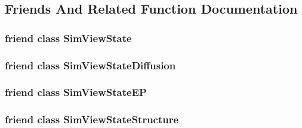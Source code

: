\subsection{Friends And Related Function Documentation}
\hypertarget{classgl_atrium_a9879084bed338fc174a8d2fe04996ce3}{
\subsubsection[{Sim\+View\+State}]{\setlength{\rightskip}{0pt plus 5cm}friend class {\bf Sim\+View\+State}\hspace{0.3cm}{\ttfamily [friend]}}}\label{classgl_atrium_a9879084bed338fc174a8d2fe04996ce3}
\hypertarget{classgl_atrium_a1f495b2c4e91f752b635ad082004df63}{
\subsubsection[{Sim\+View\+State\+Diffusion}]{\setlength{\rightskip}{0pt plus 5cm}friend class {\bf Sim\+View\+State\+Diffusion}\hspace{0.3cm}{\ttfamily [friend]}}}\label{classgl_atrium_a1f495b2c4e91f752b635ad082004df63}
\hypertarget{classgl_atrium_a76eb2c10fcf71ef86e90466fa0becdcb}{
\subsubsection[{Sim\+View\+State\+E\+P}]{\setlength{\rightskip}{0pt plus 5cm}friend class {\bf Sim\+View\+State\+E\+P}\hspace{0.3cm}{\ttfamily [friend]}}}\label{classgl_atrium_a76eb2c10fcf71ef86e90466fa0becdcb}
\hypertarget{classgl_atrium_a05f31e8af7a8b263cc06dbc57b20f144}{
\subsubsection[{Sim\+View\+State\+Structure}]{\setlength{\rightskip}{0pt plus 5cm}friend class {\bf Sim\+View\+State\+Structure}\hspace{0.3cm}{\ttfamily [friend]}}}\label{classgl_atrium_a05f31e8af7a8b263cc06dbc57b20f144}
